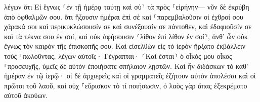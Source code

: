 \documentclass{openreader}
\begin{document}
λέγων ὅτι Εἰ ἔγνως ⸂ἐν τῇ ἡμέρᾳ ταύτῃ καὶ σὺ⸃ τὰ πρὸς ⸀εἰρήνην— νῦν δὲ ἐκρύβη ἀπὸ ὀφθαλμῶν σου. 
ὅτι ἥξουσιν ἡμέραι ἐπὶ σὲ καὶ ⸀παρεμβαλοῦσιν οἱ ἐχθροί σου χάρακά σοι καὶ περικυκλώσουσίν σε καὶ συνέξουσίν σε πάντοθεν, 
καὶ ἐδαφιοῦσίν σε καὶ τὰ τέκνα σου ἐν σοί, καὶ οὐκ ἀφήσουσιν ⸂λίθον ἐπὶ λίθον ἐν σοί⸃, ἀνθ’ ὧν οὐκ ἔγνως τὸν καιρὸν τῆς ἐπισκοπῆς σου. 
Καὶ εἰσελθὼν εἰς τὸ ἱερὸν ἤρξατο ἐκβάλλειν τοὺς ⸀πωλοῦντας, 
λέγων αὐτοῖς· Γέγραπται· ⸂Καὶ ἔσται⸃ ὁ οἶκός μου οἶκος ⸀προσευχῆς, ὑμεῖς δὲ αὐτὸν ἐποιήσατε σπήλαιον λῃστῶν. 
Καὶ ἦν διδάσκων τὸ καθ’ ἡμέραν ἐν τῷ ἱερῷ· οἱ δὲ ἀρχιερεῖς καὶ οἱ γραμματεῖς ἐζήτουν αὐτὸν ἀπολέσαι καὶ οἱ πρῶτοι τοῦ λαοῦ, 
καὶ οὐχ ⸀εὕρισκον τὸ τί ποιήσωσιν, ὁ λαὸς γὰρ ἅπας ἐξεκρέματο αὐτοῦ ἀκούων. 
\end{document}
